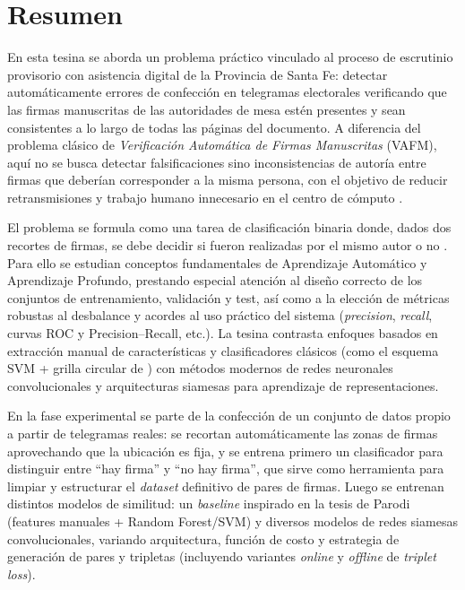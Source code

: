 \chapter{Resumen}

En esta tesina se aborda un problema práctico vinculado al proceso de escrutinio provisorio con asistencia digital de la Provincia de Santa Fe: detectar automáticamente errores de confección en telegramas electorales verificando que las firmas manuscritas de las autoridades de mesa estén presentes y sean consistentes a lo largo de todas las páginas del documento. A diferencia del problema clásico de \textit{Verificación Automática de Firmas Manuscritas} (VAFM), aquí no se busca detectar falsificaciones sino inconsistencias de autoría entre firmas que deberían corresponder a la misma persona, con el objetivo de reducir retransmisiones y trabajo humano innecesario en el centro de cómputo \cite{unr-informe,tesis-parodi}. 

El problema se formula como una tarea de clasificación binaria donde, dados dos recortes de firmas, se debe decidir si fueron realizadas por el mismo autor o no \cite{metricas-binarias}. Para ello se estudian conceptos fundamentales de Aprendizaje Automático y Aprendizaje Profundo, prestando especial atención al diseño correcto de los conjuntos de entrenamiento, validación y test, así como a la elección de métricas robustas al desbalance y acordes al uso práctico del sistema (\textit{precision}, \textit{recall}, curvas ROC y Precision–Recall, etc.). La tesina contrasta enfoques basados en extracción manual de características y clasificadores clásicos (como el esquema SVM + grilla circular de \cite{tesis-parodi}) con métodos modernos de redes neuronales convolucionales y arquitecturas siamesas para aprendizaje de representaciones.

En la fase experimental se parte de la confección de un conjunto de datos propio a partir de telegramas reales: se recortan automáticamente las zonas de firmas aprovechando que la ubicación es fija, y se entrena primero un clasificador para distinguir entre “hay firma” y “no hay firma”, que sirve como herramienta para limpiar y estructurar el \textit{dataset} definitivo de pares de firmas. Luego se entrenan distintos modelos de similitud: un \textit{baseline} inspirado en la tesis de Parodi (features manuales + Random Forest/SVM) y diversos modelos de redes siamesas convolucionales, variando arquitectura, función de costo y estrategia de generación de pares y tripletas (incluyendo variantes \textit{online} y \textit{offline} de \textit{triplet loss}). 

